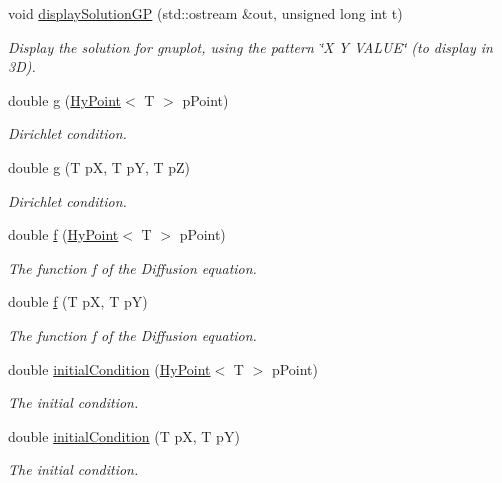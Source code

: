 \begin{DoxyCompactItemize}
\item 
void \hyperlink{classHyDiffusion2D_a88da599f17d9a34ee45526cf8beffa54}{displaySolutionGP} (std::ostream \&out, unsigned long int t)
\begin{DoxyCompactList}\small\item\em Display the solution for gnuplot, using the pattern \char`\"{}X Y VALUE\char`\"{} (to display in 3D). \item\end{DoxyCompactList}\item 
double \hyperlink{classHyDiffusion2D_a0df1a7fbe0b6a50d85a74c655f32cfb2}{g} (\hyperlink{classHyPoint}{HyPoint}$<$ T $>$ pPoint)
\begin{DoxyCompactList}\small\item\em Dirichlet condition. \item\end{DoxyCompactList}\item 
double \hyperlink{classHyDiffusion2D_ae09f11a685b241e42b466d023b1d23fc}{g} (T pX, T pY, T pZ)
\begin{DoxyCompactList}\small\item\em Dirichlet condition. \item\end{DoxyCompactList}\item 
double \hyperlink{classHyDiffusion2D_a40c7ec43e3b5e0d1d1d518dabd3a2299}{f} (\hyperlink{classHyPoint}{HyPoint}$<$ T $>$ pPoint)
\begin{DoxyCompactList}\small\item\em The function f of the Diffusion equation. \item\end{DoxyCompactList}\item 
double \hyperlink{classHyDiffusion2D_aea84648a2e7b70f9eda67ef603102a11}{f} (T pX, T pY)
\begin{DoxyCompactList}\small\item\em The function f of the Diffusion equation. \item\end{DoxyCompactList}\item 
double \hyperlink{classHyDiffusion2D_a07622cf68cbd0571101807eedcb3a76d}{initialCondition} (\hyperlink{classHyPoint}{HyPoint}$<$ T $>$ pPoint)
\begin{DoxyCompactList}\small\item\em The initial condition. \item\end{DoxyCompactList}\item 
double \hyperlink{classHyDiffusion2D_ae04d50ba468b2338bbf4d134d43ffe49}{initialCondition} (T pX, T pY)
\begin{DoxyCompactList}\small\item\em The initial condition. \item\end{DoxyCompactList}\end{DoxyCompactItemize}
